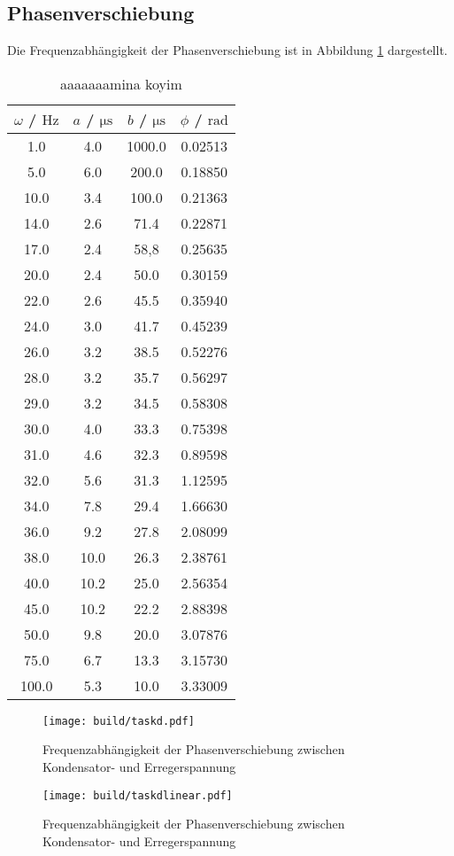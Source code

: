 \subsection{Phasenverschiebung}

Die Frequenzabhängigkeit der Phasenverschiebung ist in Abbildung \ref{fig:phasenplot} dargestellt.

\begin{table}
	\caption{aaaaaaamina koyim}
	\centering
	\label{tab:muh}
	\begin{tabular}{cccc}
		\toprule
		$\omega$ / $\si{\Hz}$ & $a$ / $\si{\micro\second}$ & $b$ / $\si{\micro\second}$ & $\phi$ / $\si{\radian}$ \\
		\midrule
		1.0 & 4.0 & 1000.0 & 0.02513 \\
		5.0 & 6.0 & 200.0 & 0.18850 \\
		10.0 & 3.4 & 100.0 & 0.21363 \\
		14.0 & 2.6 & 71.4 & 0.22871 \\
		17.0 & 2.4 & 58,8 & 0.25635 \\
		20.0 & 2.4 & 50.0 & 0.30159 \\
		22.0 & 2.6 & 45.5 & 0.35940 \\
		24.0 & 3.0 & 41.7 & 0.45239 \\
		26.0 & 3.2 & 38.5 & 0.52276 \\
		28.0 & 3.2 & 35.7 & 0.56297 \\
		29.0 & 3.2 & 34.5 & 0.58308 \\
		30.0 & 4.0 & 33.3 & 0.75398 \\
		31.0 & 4.6 & 32.3 & 0.89598 \\
		32.0 & 5.6 & 31.3 & 1.12595 \\
		34.0 & 7.8 & 29.4 & 1.66630 \\
		36.0 & 9.2 & 27.8 & 2.08099 \\
		38.0 & 10.0 & 26.3 & 2.38761 \\
		40.0 & 10.2 & 25.0 & 2.56354 \\
		45.0 & 10.2 & 22.2 & 2.88398 \\
		50.0 & 9.8 & 20.0 & 3.07876 \\
		75.0 & 6.7 & 13.3 & 3.15730 \\
		100.0 & 5.3 & 10.0 & 3.33009 \\
	\bottomrule
	\end{tabular}
\end{table}



\begin{figure}
	\centering
	\texttt{[image: build/taskd.pdf]}
	\caption{Frequenzabhängigkeit der Phasenverschiebung zwischen Kondensator- und Erregerspannung}
	\label{fig:phasenplot}
\end{figure}



\begin{figure}
	\centering
	\texttt{[image: build/taskdlinear.pdf]}
	\caption{Frequenzabhängigkeit der Phasenverschiebung zwischen Kondensator- und Erregerspannung}
	\label{fig:phasenplotlinear}
\end{figure}
